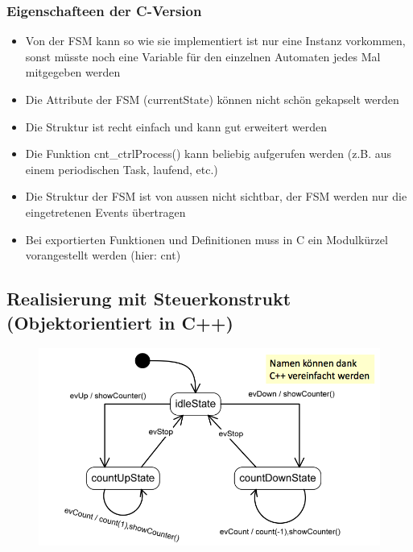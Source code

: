 \subsubsection{Eigenschafteen der C-Version}
\begin{itemize}
  \item Von der FSM kann so wie sie implementiert ist nur eine Instanz vorkommen, sonst müsste noch eine Variable für den einzelnen Automaten jedes Mal mitgegeben werden
  \item Die Attribute der FSM (currentState) können nicht schön gekapselt werden
  \item Die Struktur ist recht einfach und kann gut erweitert werden
  \item Die Funktion cnt\_ctrlProcess() kann beliebig aufgerufen werden (z.B. aus einem periodischen Task, laufend, etc.)
  \item Die Struktur der FSM ist von aussen nicht sichtbar, der FSM werden nur die eingetretenen Events übertragen
  \item Bei exportierten Funktionen und Definitionen muss in C ein Modulkürzel vorangestellt werden (hier: cnt)
\end{itemize}


\subsection{Realisierung mit Steuerkonstrukt (Objektorientiert in
C++)}

\begin{figure}[h]
  \centering
  \includegraphics[scale = 0.35]{images/FSM/Up_down_counter_obj}
\end{figure}

